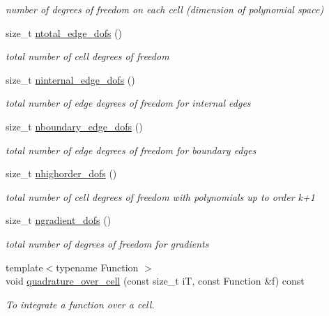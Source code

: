 \begin{DoxyCompactItemize}
\begin{DoxyCompactList}\small\item\em number of degrees of freedom on each cell (dimension of polynomial space) \end{DoxyCompactList}\item 
size\+\_\+t \hyperlink{group__HybridCore_ga49a703b6786215e5acf8bb59ecdbc9ea}{ntotal\+\_\+edge\+\_\+dofs} ()
\begin{DoxyCompactList}\small\item\em total number of cell degrees of freedom \end{DoxyCompactList}\item 
size\+\_\+t \hyperlink{group__HybridCore_gae6e771ab58f248db8f051d47de982cf5}{ninternal\+\_\+edge\+\_\+dofs} ()
\begin{DoxyCompactList}\small\item\em total number of edge degrees of freedom for internal edges \end{DoxyCompactList}\item 
size\+\_\+t \hyperlink{group__HybridCore_ga5fd63afc45211d3005f6e25682c533b2}{nboundary\+\_\+edge\+\_\+dofs} ()
\begin{DoxyCompactList}\small\item\em total number of edge degrees of freedom for boundary edges \end{DoxyCompactList}\item 
size\+\_\+t \hyperlink{group__HybridCore_gaa7f78bc066429a18ad596d45a79d37bc}{nhighorder\+\_\+dofs} ()
\begin{DoxyCompactList}\small\item\em total number of cell degrees of freedom with polynomials up to order k+1 \end{DoxyCompactList}\item 
size\+\_\+t \hyperlink{group__HybridCore_ga6f7c5ef5103bed8a3e0ecc18d592b1f9}{ngradient\+\_\+dofs} ()
\begin{DoxyCompactList}\small\item\em total number of degrees of freedom for gradients \end{DoxyCompactList}\item 
{\footnotesize template$<$typename Function $>$ }\\void \hyperlink{group__HybridCore_ga3c33c8cec55dbe2d8873e53fcd43d01f}{quadrature\+\_\+over\+\_\+cell} (const size\+\_\+t iT, const Function \&f) const
\begin{DoxyCompactList}\small\item\em To integrate a function over a cell. \end{DoxyCompactList}\item 

\end{DoxyCompactItemize}
